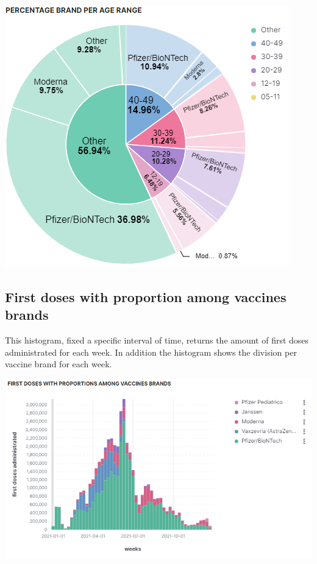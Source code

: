 \documentclass{article}
\begin{document}
\begin{center}
\includegraphics[scale=0.5]{perc_brand_age_range.png}
\end{center}

\subsection{First doses with proportion among vaccines brands}
This histogram, fixed a specific interval of time, returns the amount of first doses administrated for each week. In addition the histogram shows the division per vaccine brand for each week.

\begin{center}
\includegraphics[scale=0.6]{first_doses_vacc_brand.png}
\end{center}
\end{document}

